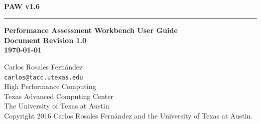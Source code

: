 \documentclass[10pt,a4paper]{report}
\begin{document}
\begin{titlepage}
\thispagestyle{empty}	%
\verb+ +
\vspace{1em}
\begin{flushright}
\huge\bf PAW v1.6\\
\rule{\textwidth}{4pt}
\large{\bf Performance Assessment Workbench User Guide\\
Document Revision 1.0\\
\today}
\end{flushright}

\newpage
\thispagestyle{empty}
\begin{flushleft}
Carlos Rosales Fern\'andez\\
\verb+carlos@tacc.utexas.edu+\\
\vspace{0.5em}
High Performance Computing \\
Texas Advanced Computing Center\\
The University of Texas at Austin\\
\vspace{1cm}
Copyright 2016 Carlos Rosales Fern\'andez and the University of Texas at Austin.
\end{flushleft}
\newpage
\end{titlepage}
\end{document}
